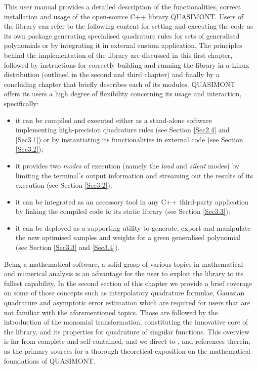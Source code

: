 \documentclass[a4paper, twosided]{book}
\begin{document}
This user manual provides a detailed description of the functionalities, correct installation and usage of the open-source C++ library QUASIMONT. Users of the library can refer to the following content for setting and executing the code as its own package generating specialised quadrature rules for sets of generalised polynomials or by integrating it in external custom application. The principles behind the implementation of the library are discussed in this first chapter, followed by instructions for correctly building and running the library in a Linux distribution (outlined in the second and third chapter) and finally by a concluding chapter that briefly describes each of its modules. QUASIMONT offers its users a high degree of flexibility concerning its usage and interaction, specifically:
\begin{itemize}
    \item it can be compiled and executed either as a stand-alone software implementing high-precision quadrature rules (see Section \ref{Sec2.4} and \ref{Sec3.1}) or by instantiating its functionalities in external code (see Section \ref{Sec3.2});
    \item it provides two {\itshape modes} of execution (namely the {\itshape loud} and {\itshape silent} modes) by limiting the terminal's output information and streaming out the results of its execution (see Section \ref{Sec3.2});
    \item it can be integrated as an accessory tool in any C++ third-party application by linking the compiled code to its static library (see Section \ref{Sec3.3});
    \item it can be deployed as a supporting utility to generate, export and manipulate the new optimised samples and weights for a given generalised polynomial (see Section \ref{Sec3.3} and \ref{Sec3.4}).
\end{itemize}
Being a mathematical software, a solid grasp of various topics in mathematical and numerical analysis is an advantage for the user to exploit the library to its fullest capability. In the second section of this chapter we provide a brief coverage on some of those concepts such as interpolatory quadrature formulae, Gaussian quadrature and asymptotic error estimation which are required for users that are not familiar with the aforementioned topics. Those are followed by the introduction of the monomial transformation, constituting the innovative core of the library, and its properties for quadrature of singular functions. This overview is far from complete and self-contained, and we direct to \cite{Lombardi09, Lombardi21}, and references therein, as the primary sources for a thorough theoretical exposition on the mathematical foundations of QUASIMONT.
\end{document}
